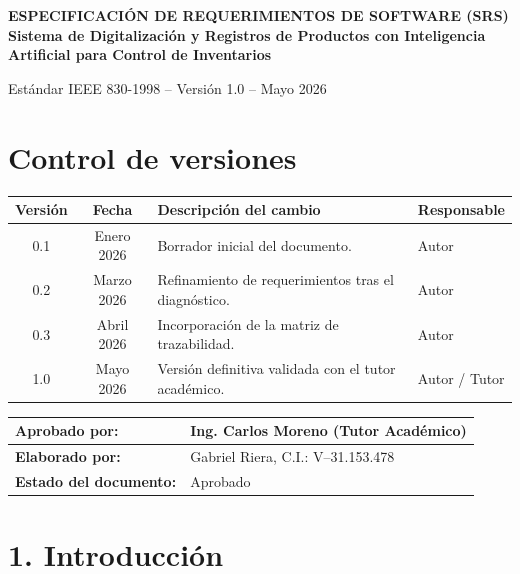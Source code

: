 \documentclass[12pt, letterpaper]{report}
\begin{document}
\vspace{8pt}

\begin{center}
{\fontsize{13}{15}\selectfont\bfseries
ESPECIFICACIÓN DE REQUERIMIENTOS DE SOFTWARE (SRS)\\
Sistema de Digitalización y Registros de Productos con Inteligencia
Artificial para Control de Inventarios\par}
\vspace{4pt}
{\small Estándar IEEE 830-1998 -- Versión 1.0 -- Mayo 2026\par}
\end{center}

\section*{Control de versiones}

\noindent
\begin{tabular}{|c|c|p{6.5cm}|p{3.0cm}|}
\hline
\textbf{Versión} & \textbf{Fecha} & \textbf{Descripción del cambio} & \textbf{Responsable} \\
\hline
0.1 & Enero 2026 & Borrador inicial del documento. & Autor \\
\hline
0.2 & Marzo 2026 & Refinamiento de requerimientos tras el diagnóstico. & Autor \\
\hline
0.3 & Abril 2026 & Incorporación de la matriz de trazabilidad. & Autor \\
\hline
1.0 & Mayo 2026 & Versión definitiva validada con el tutor académico. & Autor / Tutor \\
\hline
\end{tabular}

\vspace{12pt}

\noindent
\begin{tabular}{|p{4cm}|p{9.5cm}|}
\hline
\textbf{Aprobado por:} & Ing. Carlos Moreno (Tutor Académico) \\
\hline
\textbf{Elaborado por:} & Gabriel Riera, C.I.: V--31.153.478 \\
\hline
\textbf{Estado del documento:} & Aprobado \\
\hline
\end{tabular}

\section*{1. Introducción}
\end{document}
